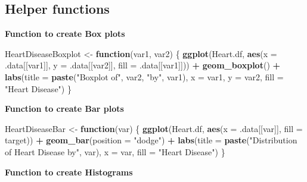 \documentclass[
]{article}
\newenvironment{Shaded}{\begin{snugshade}}{\end{snugshade}}
\newcommand{\AttributeTok}[1]{\textcolor[rgb]{0.13,0.29,0.53}{#1}}
\newcommand{\ControlFlowTok}[1]{\textcolor[rgb]{0.13,0.29,0.53}{\textbf{#1}}}
\newcommand{\FunctionTok}[1]{\textcolor[rgb]{0.13,0.29,0.53}{\textbf{#1}}}
\newcommand{\NormalTok}[1]{#1}
\newcommand{\OtherTok}[1]{\textcolor[rgb]{0.56,0.35,0.01}{#1}}
\newcommand{\SpecialCharTok}[1]{\textcolor[rgb]{0.81,0.36,0.00}{\textbf{#1}}}
\newcommand{\StringTok}[1]{\textcolor[rgb]{0.31,0.60,0.02}{#1}}
\begin{document}
\subsection{Helper functions}\label{helper-functions}

\textbf{Function to create Box plots}

\begin{Shaded}
\begin{Highlighting}[]
\NormalTok{HeartDiseaseBoxplot }\OtherTok{\textless{}{-}} \ControlFlowTok{function}\NormalTok{(var1, var2) \{}
  \FunctionTok{ggplot}\NormalTok{(Heart.df, }\FunctionTok{aes}\NormalTok{(}\AttributeTok{x =}\NormalTok{ .data[[var1]],}
                       \AttributeTok{y =}\NormalTok{ .data[[var2]],}
                       \AttributeTok{fill =}\NormalTok{ .data[[var1]])) }\SpecialCharTok{+}
    \FunctionTok{geom\_boxplot}\NormalTok{() }\SpecialCharTok{+} 
    \FunctionTok{labs}\NormalTok{(}\AttributeTok{title =} \FunctionTok{paste}\NormalTok{(}\StringTok{"Boxplot of"}\NormalTok{, var2, }\StringTok{"by"}\NormalTok{, var1),}
         \AttributeTok{x =}\NormalTok{ var1, }\AttributeTok{y =}\NormalTok{ var2, }\AttributeTok{fill =} \StringTok{"Heart Disease"}\NormalTok{)}
\NormalTok{\}}
\end{Highlighting}
\end{Shaded}

\textbf{Function to create Bar plots}

\begin{Shaded}
\begin{Highlighting}[]
\NormalTok{HeartDiseaseBar }\OtherTok{\textless{}{-}} \ControlFlowTok{function}\NormalTok{(var) \{}
  \FunctionTok{ggplot}\NormalTok{(Heart.df, }\FunctionTok{aes}\NormalTok{(}\AttributeTok{x =}\NormalTok{ .data[[var]], }\AttributeTok{fill =}\NormalTok{ target)) }\SpecialCharTok{+}
    \FunctionTok{geom\_bar}\NormalTok{(}\AttributeTok{position =} \StringTok{"dodge"}\NormalTok{) }\SpecialCharTok{+}
    \FunctionTok{labs}\NormalTok{(}\AttributeTok{title =} \FunctionTok{paste}\NormalTok{(}\StringTok{"Distribution of Heart Disease by"}\NormalTok{, var),}
         \AttributeTok{x =}\NormalTok{ var, }\AttributeTok{fill =} \StringTok{"Heart Disease"}\NormalTok{)}
\NormalTok{\}}
\end{Highlighting}
\end{Shaded}

\textbf{Function to create Histograms}
\end{document}
